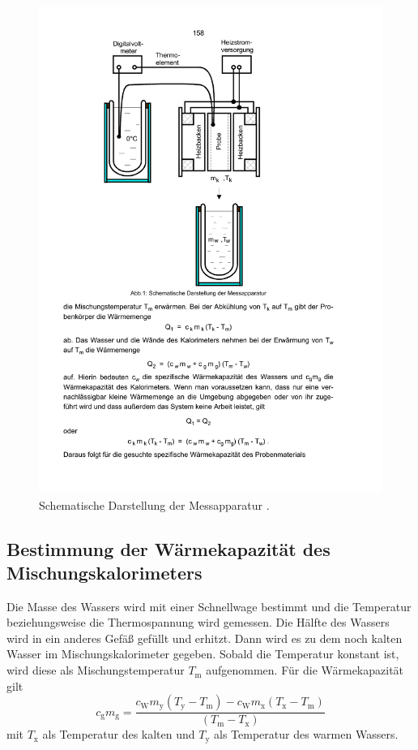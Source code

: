 \begin{figure}
  \centering
  \includegraphics[scale=0.6]{content/aufbau.pdf}
\caption{Schematische Darstellung der Messapparatur \cite{anleitung201}.}
  \label{fig:aufbau}
\end{figure}

\subsection{Bestimmung der Wärmekapazität des Mischungskalorimeters}
Die Masse des Wassers wird mit einer Schnellwage bestimmt und die Temperatur beziehungsweise die Thermospannung wird gemessen. Die Hälfte des Wassers wird in ein anderes Gefäß gefüllt und erhitzt. Dann wird es zu dem noch kalten Wasser im Mischungskalorimeter gegeben. Sobald die Temperatur konstant ist, wird diese als Mischungstemperatur $T_\mathrm{m}$ aufgenommen.
Für die Wärmekapazität gilt
\begin{equation}
  \label{eqn:cgmg}
  c_\mathrm{g}m_\mathrm{g} = \frac{c_\mathrm{W}m_\mathrm{y}(T_\mathrm{y} - T_\mathrm{m}) - c_\mathrm{W}m_\mathrm{x}(T_\mathrm{x} - T_\mathrm{m})}{(T_\mathrm{m} - T_\mathrm{x})}
\end{equation}
mit $T_\mathrm{x}$ als Temperatur des kalten und $T_\mathrm{y}$ als Temperatur des warmen Wassers.

